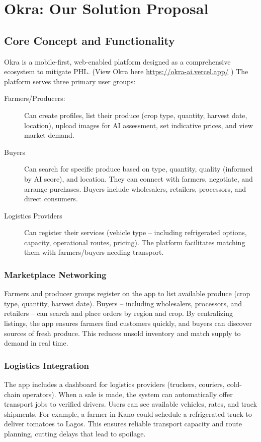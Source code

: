 \chapter[Okra: Our Solution Proposal]{Okra: Our Solution Proposal}
\label{cp:okra-solution}

{
\parindent0pt

\section{Core Concept and Functionality}
Okra is a mobile-first, web-enabled platform designed as a comprehensive ecosystem to mitigate PHL. (View Okra here \url{https://okra-ai.vercel.app/} ) The platform serves three primary user groups:

\begin{description}
    \item[Farmers/Producers:] Can create profiles, list their produce (crop type, quantity, harvest date, location), upload images for AI assessment, set indicative prices, and view market demand.
    
    \item[Buyers] Can search for specific produce based on type, quantity, quality (informed by AI score), and location. They can connect with farmers, negotiate, and arrange purchases. Buyers include wholesalers, retailers, processors, and direct consumers.
    
    \item[Logistics Providers] Can register their services (vehicle type – including refrigerated options, capacity, operational routes, pricing). The platform facilitates matching them with farmers/buyers needing transport.
\end{description}

\subsection{Marketplace Networking}
Farmers and producer groups register on the app to list available produce (crop type, quantity, harvest date). Buyers – including wholesalers, processors, and retailers – can search and place orders by region and crop. By centralizing listings, the app ensures farmers find customers quickly, and buyers can discover sources of fresh produce. This reduces unsold inventory and match supply to demand in real time.

\subsection{Logistics Integration}
The app includes a dashboard for logistics providers (truckers, couriers, cold-chain operators). When a sale is made, the system can automatically offer transport jobs to verified drivers. Users can see available vehicles, rates, and track shipments. For example, a farmer in Kano could schedule a refrigerated truck to deliver tomatoes to Lagos. This ensures reliable transport capacity and route planning, cutting delays that lead to spoilage.

}
